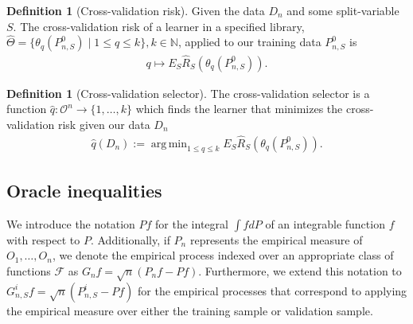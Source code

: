 \documentclass[11pt, a4paper]{article}
\DeclareMathOperator*{\argmin}{arg\,min}
\theoremstyle{definition}
\newtheorem{definition}[theorem]{Definition}
\theoremstyle{remark}
\newcommand{\q}{q}
\newcommand{\btheta}{\theta}
\begin{document}
\begin{definition}[Cross-validation risk]
    Given the data $ D_n $ and some split-variable $ S $. The cross-validation risk of a learner in a specified library, $ \hat{\Theta} = \{ \btheta_{\q}(P_{n, S}^{0}) \mid 1 \leq \q \leq k \}, k \in \mathbb{N} $, applied to our training data $ P_{n, S}^{0} $ is  
    \begin{align*}
        \q \mapsto E_S \hat{R}_S( \btheta_\q(P_{n,S}^{0})).
    \end{align*}
\end{definition}

\begin{definition}[Cross-validation selector]
    The cross-validation selector is a function $ \hat{\q}: \mathcal{O}^{n} \to \{1,\ldots,k\} $  which finds the learner that minimizes the cross-validation risk given our data $ D_n $
    \begin{align*}
        \hat{\q}(D_n) := \argmin_{1 \leq \q \leq k} E_S \hat{R}_S ( \btheta _\q (P_{n,S}^0 )). 
    \end{align*}
\end{definition}
%
\subsection{Oracle inequalities}
We introduce the notation $Pf$ for the integral $\int f dP$ of an integrable function $f$ with respect to $P$. Additionally, if $P_n$ represents the empirical measure of $O_1, \dots, O_n$, we denote the empirical process indexed over an appropriate class of functions $\mathcal{F}$ as $G_n f = \sqrt{n}(P_n f - P f)$. Furthermore, we extend this notation to $G_{n, S}^{i} f = \sqrt{n}(P_{n, S}^{i} - Pf)$ for the empirical processes that correspond to applying the empirical measure over either the training sample or validation sample.
\end{document}
